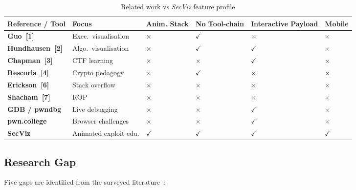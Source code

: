\documentclass[12pt,a4paper]{article}
\newcommand{\SV}{\textit{SecViz}}
\newcommand{\tick}{\textcolor{svgreen}{$\checkmark$}}
\newcommand{\cross}{\textcolor{svred}{$\times$}}
\begin{document}
\begin{table}[H]
\centering
\caption{Related work vs \SV{} feature profile}
\label{tab:comparison}
\renewcommand{\arraystretch}{1.3}
\begin{tabular}{>{\bfseries}p{3.4cm} p{3cm}
                >{\centering}p{1.5cm} >{\centering}p{1.5cm}
                >{\centering}p{1.7cm} >{\centering\arraybackslash}p{1.3cm}}
\toprule
\textbf{Reference / Tool} & \textbf{Focus} & \textbf{Anim. Stack} & \textbf{No Tool-chain} & \textbf{Interactive Payload} & \textbf{Mobile} \\
\midrule
Guo~[1]           & Exec.\ visualisation     & \cross & \tick  & \cross & \cross \\
Hundhausen~[2]    & Algo.\ visualisation     & \cross & \tick  & \tick  & \cross \\
Chapman~[3]       & CTF learning             & \cross & \cross & \tick  & \cross \\
Rescorla~[4]      & Crypto pedagogy          & \cross & \tick  & \cross & \cross \\
Erickson~[6]      & Stack overflow           & \cross & \cross & \cross & \cross \\
Shacham~[7]       & ROP                      & \cross & \cross & \cross & \cross \\
GDB / pwndbg      & Live debugging           & \cross & \cross & \tick  & \cross \\
pwn.college       & Browser challenges       & \cross & \cross & \tick  & \cross \\
\textbf{SecViz}   & Animated exploit edu.    & \tick  & \tick  & \tick  & \tick  \\
\bottomrule
\end{tabular}
\end{table}

\subsection{Research Gap}

Five gaps are identified from the surveyed literature~\cite{litsurvey2026}:
\end{document}
